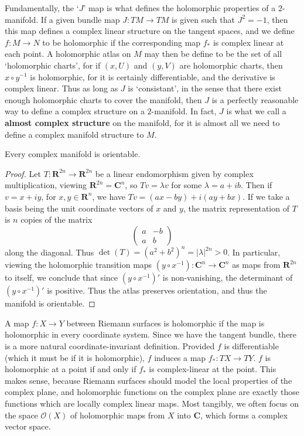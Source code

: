 \begin{remark}
    Fundamentally, the `$J$' map is what defines the holomorphic properties of a $2$-manifold. If a given bundle map $J:TM \to TM$ is given such that $J^2 = -1$, then this map defines a complex linear structure on the tangent spaces, and we define $f: M \to N$ to be holomorphic if the corresponding map $f_*$ is complex linear at each point. A holomorphic atlas on $M$ may then be define to be the set of all `holomorphic charts', for if $(x,U)$ and $(y,V)$ are holomorphic charts, then $x \circ y^{-1}$ is holomorphic, for it is certainly differentiable, and the derivative is complex linear. Thus as long as $J$ is `consistant', in the sense that there exist enough holomorphic charts to cover the manifold, then $J$ is a perfectly reasonable way to define a complex structure on a $2$-manifold. In fact, $J$ is what we call a {\bf almost complex structure} on the manifold, for it is almost all we need to define a complex manifold structure to $M$.
\end{remark}

\begin{theorem}
    Every complex manifold is orientable.
\end{theorem}
\begin{proof}
    Let $T: \mathbf{R}^{2n} \to \mathbf{R}^{2n}$ be a linear endomorphism given by complex multiplication, viewing $\mathbf{R}^{2n} = \mathbf{C}^n$, so $Tv = \lambda v$ for some $\lambda = a + ib$. Then if $v = x + iy$, for $x,y \in \mathbf{R}^n$, we have $Tv = (ax - by) + i(ay + bx)$. If we take a basis being the unit coordinate vectors of $x$ and $y$, the matrix representation of $T$ is $n$ copies of the matrix
    \[ \begin{pmatrix} a & -b \\ a & b \end{pmatrix} \]
    along the diagonal. Thus $\det(T) = (a^2 + b^2)^n = |\lambda|^{2n} > 0$. In particular, viewing the holomorphic transition maps $(y \circ x^{-1}): \mathbf{C}^n \to \mathbf{C}^n$ as maps from $\mathbf{R}^{2n}$ to itself, we conclude that since $(y \circ x^{-1})'$ is non-vanishing, the determinant of $(y \circ x^{-1})'$ is positive. Thus the atlas preserves orientation, and thus the manifold is orientable.
\end{proof}

A map $f: X \to Y$ between Riemann surfaces is holomorphic if the map is holomorphic in every coordinate system. Since we have the tangent bundle, there is a more natural coordinate-invariant definition. Provided $f$ is differentiable (which it must be if it is holomorphic), $f$ induces a map $f_*: TX \to TY$. $f$ is holomorphic at a point if and only if $f_*$ is complex-linear at the point. This makes sense, because Riemann surfaces should model the local properties of the complex plane, and holomorphic functions on the complex plane are exactly those functions which are locally complex linear maps. Most tangibly, we often focus on the space $\mathcal{O}(X)$ of holomorphic maps from $X$ into $\mathbf{C}$, which forms a complex vector space.

